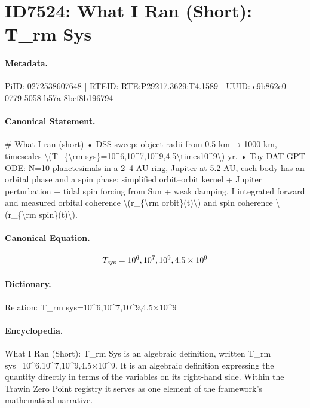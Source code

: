 \section*{ID7524: What I Ran (Short): T\_rm Sys}
\paragraph{Metadata.}
PiID: 0272538607648 | RTEID: RTE:P29217.3629:T4.1589 | UUID: e9b862c0-0779-5058-b57a-8bef8b196794

\paragraph{Canonical Statement.}
\# What I ran (short) • DSS sweep: object radii from 0.5 km → 1000 km, timescales \textbackslash{}(T\_\{\textbackslash{}rm sys\}=10\textasciicircum{}6,10\textasciicircum{}7,10\textasciicircum{}9,4.5\textbackslash{}times10\textasciicircum{}9\textbackslash{}) yr. • Toy DAT-GPT ODE: N=10 planetesimals in a 2–4 AU ring, Jupiter at 5.2 AU, each body has an orbital phase and a spin phase; simplified orbit–orbit kernel + Jupiter perturbation + tidal spin forcing from Sun + weak damping. I integrated forward and measured orbital coherence \textbackslash{}(r\_\{\textbackslash{}rm orbit\}(t)\textbackslash{}) and spin coherence \textbackslash{}(r\_\{\textbackslash{}rm spin\}(t)\textbackslash{}).

\paragraph{Canonical Equation.}
\[
T_{\rm sys}=10^6,10^7,10^9,4.5\times10^9
\]

\paragraph{Dictionary.}
Relation: T\_rm sys=10\textasciicircum{}6,10\textasciicircum{}7,10\textasciicircum{}9,4.5×10\textasciicircum{}9

\paragraph{Encyclopedia.}
What I Ran (Short): T\_rm Sys is an algebraic definition, written T\_rm sys=10\textasciicircum{}6,10\textasciicircum{}7,10\textasciicircum{}9,4.5×10\textasciicircum{}9. It is an algebraic definition expressing the quantity directly in terms of the variables on its right-hand side. Within the Trawin Zero Point registry it serves as one element of the framework's mathematical narrative.
